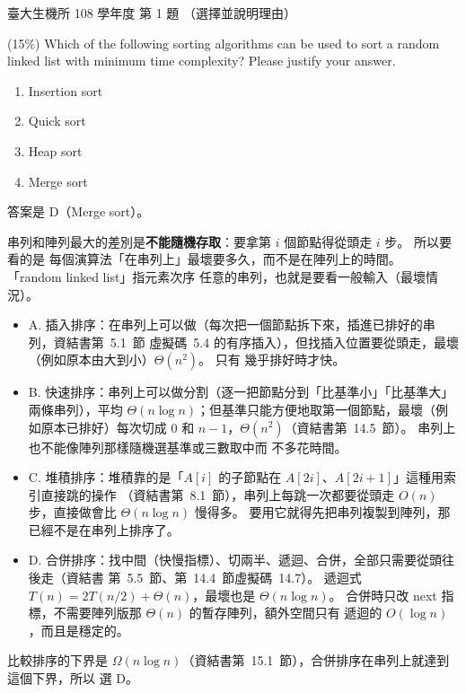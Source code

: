 \begin{pastexam}[label={px:ntu-108-bime-ds-01}]{臺大生機所 108 學年度 第 1 題}
（選擇並說明理由）

(15\%) Which of the following sorting algorithms can be used to sort a random linked list with
minimum time complexity? Please justify your answer.
\begin{enumerate}[label=\Alph*.]
\item Insertion sort
\item Quick sort
\item Heap sort
\item Merge sort
\end{enumerate}
\end{pastexam}

\begin{pastsoln}
答案是 D（Merge sort）。

串列和陣列最大的差別是\textbf{不能隨機存取}：要拿第 $i$ 個節點得從頭走 $i$ 步。 所以要看的是
每個演算法「在串列上」最壞要多久，而不是在陣列上的時間。 「random linked list」指元素次序
任意的串列，也就是要看一般輸入（最壞情況）。

\begin{itemize}
\item A. 插入排序：在串列上可以做（每次把一個節點拆下來，插進已排好的串列，資結書第~5.1~節
虛擬碼~5.4 的有序插入），但找插入位置要從頭走，最壞（例如原本由大到小）$\Theta(n^2)$。 只有
幾乎排好時才快。
\item B. 快速排序：串列上可以做分割（逐一把節點分到「比基準小」「比基準大」兩條串列），平均
$\Theta(n \log n)$；但基準只能方便地取第一個節點，最壞（例如原本已排好）每次切成 $0$ 和
$n - 1$，$\Theta(n^2)$（資結書第~14.5~節）。 串列上也不能像陣列那樣隨機選基準或三數取中而
不多花時間。
\item C. 堆積排序：堆積靠的是「$A[i]$ 的子節點在 $A[2i]$、$A[2i+1]$」這種用索引直接跳的操作
（資結書第~8.1~節），串列上每跳一次都要從頭走 $O(n)$ 步，直接做會比 $\Theta(n \log n)$ 慢得多。
要用它就得先把串列複製到陣列，那已經不是在串列上排序了。
\item D. 合併排序：找中間（快慢指標）、切兩半、遞迴、合併，全部只需要從頭往後走（資結書
第~5.5~節、第~14.4~節虛擬碼~14.7）。 遞迴式 $T(n) = 2T(n/2) + \Theta(n)$，最壞也是
$\Theta(n \log n)$。 合併時只改 next 指標，不需要陣列版那 $\Theta(n)$ 的暫存陣列，額外空間只有
遞迴的 $O(\log n)$，而且是穩定的。
\end{itemize}

比較排序的下界是 $\Omega(n \log n)$（資結書第~15.1~節），合併排序在串列上就達到這個下界，所以
選 D。
\end{pastsoln}
